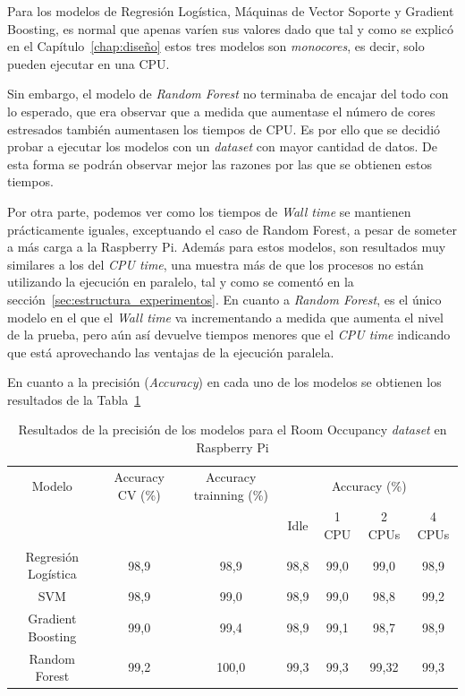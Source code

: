 \documentclass[a4paper, 12pt]{book}
\begin{document}
Para los modelos de Regresión Logística, Máquinas de Vector Soporte y Gradient Boosting, es normal que apenas varíen sus valores dado que tal y como se explicó en el Capítulo~\ref{chap:diseño} estos tres modelos son \textit{monocores}, es decir, solo pueden ejecutar en una CPU. 

Sin embargo, el modelo de \textit{Random Forest} no terminaba de encajar del todo con lo esperado, que era observar que a medida que aumentase el número de cores estresados también aumentasen los tiempos de CPU. Es por ello que se decidió probar a ejecutar los modelos con un \textit{dataset} con mayor cantidad de datos. De esta forma se podrán observar mejor las razones por las que se obtienen estos tiempos.

Por otra parte, podemos ver como los tiempos de \textit{Wall time} se mantienen prácticamente iguales, exceptuando el caso de Random Forest, a pesar de someter a más carga a la Raspberry Pi. Además para estos modelos, son resultados muy similares a los del \textit{CPU time}, una muestra más de que los procesos no están utilizando la ejecución en paralelo, tal y como se comentó en la sección~\ref{sec:estructura_experimentos}. En cuanto a \textit{Random Forest}, es el único modelo en el que el \textit{Wall time} va incrementando a medida que aumenta el nivel de la prueba, pero aún así devuelve tiempos menores que el \textit{CPU time} indicando que está aprovechando las ventajas de la ejecución paralela. 

En cuanto a la precisión (\textit{Accuracy}) en cada uno de los modelos se obtienen los resultados de la Tabla~\ref{tab:acc_Occraspberry}

\begin{table}[htb]
\renewcommand{\arraystretch}{1.5}
\begin{adjustbox}{width=\textwidth}
\centering
    \begin{tabular}{c  c  c  c  c  c  c}
    \hline
    Modelo & Accuracy CV (\%) & Accuracy trainning (\%) & \multicolumn{4}{c}{Accuracy (\%)} \\
    \cline{4-7}
     &   &   &  Idle & 1 CPU & 2 CPUs & 4 CPUs \\
     \hline
     Regresión Logística & 98,9 & 98,9 & 98,8 & 99,0 & 99,0 & 98,9\\
     SVM & 98,9 & 99,0 & 98,9 & 99,0 & 98,8 & 99,2\\
     Gradient Boosting & 99,0 & 99,4 & 98,9 & 99,1 & 98,7 & 98,9\\
     Random Forest & 99,2 & 100,0 & 99,3 & 99,3 & 99,32 & 99,3\\
    \hline
    \end{tabular}
\end{adjustbox}
\caption{Resultados de la precisión de los modelos para el Room Occupancy \textit{dataset} en Raspberry Pi}
\label{tab:acc_Occraspberry}
\end{table}
\end{document}
